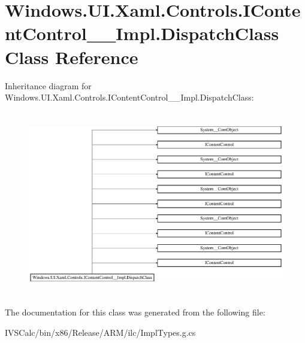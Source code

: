 \hypertarget{class_windows_1_1_u_i_1_1_xaml_1_1_controls_1_1_i_content_control_____impl_1_1_dispatch_class}{}\section{Windows.\+U\+I.\+Xaml.\+Controls.\+I\+Content\+Control\+\_\+\+\_\+\+Impl.\+Dispatch\+Class Class Reference}
\label{class_windows_1_1_u_i_1_1_xaml_1_1_controls_1_1_i_content_control_____impl_1_1_dispatch_class}
Inheritance diagram for Windows.\+U\+I.\+Xaml.\+Controls.\+I\+Content\+Control\+\_\+\+\_\+\+Impl.\+Dispatch\+Class\+:\begin{figure}[H]
\begin{center}
\leavevmode
\includegraphics[height=8.126648cm]{class_windows_1_1_u_i_1_1_xaml_1_1_controls_1_1_i_content_control_____impl_1_1_dispatch_class}
\end{center}
\end{figure}


The documentation for this class was generated from the following file\+:\begin{DoxyCompactItemize}
\item 
I\+V\+S\+Calc/bin/x86/\+Release/\+A\+R\+M/ilc/Impl\+Types.\+g.\+cs\end{DoxyCompactItemize}
